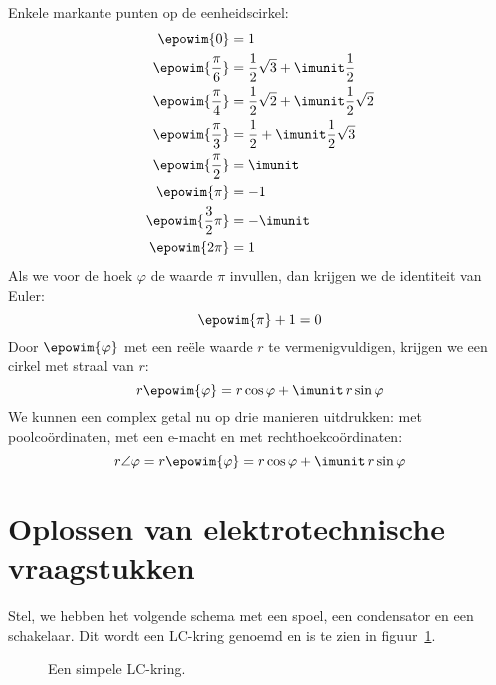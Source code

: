 Enkele markante punten op de eenheidscirkel:
%
\begin{equation}
\begin{split}
\epowim{0} &= 1 \\
\epowim{\frac{\pi}{6}} &= \frac{1}{2}\sqrt{3} + \imunit\frac{1}{2}\\
\epowim{\frac{\pi}{4}} &= \frac{1}{2}\sqrt{2} + \imunit\frac{1}{2}\sqrt{2}\\
\epowim{\frac{\pi}{3}} &= \frac{1}{2} + \imunit\frac{1}{2}\sqrt{3}\\
\epowim{\frac{\pi}{2}} &= \imunit \\
\epowim{\pi} &= -1 \\
\epowim{\frac{3}{2}\pi} &= -\imunit \\
\epowim{2\pi} &= 1 \\
\end{split}
\end{equation}
%
%
Als we voor de hoek $\varphi$ de waarde $\pi$ invullen, dan krijgen we de identiteit van Euler:
%
\begin{equation}
\epowim{\pi} + 1 = 0
\end{equation}Door $\epowim{\varphi}$ met een reële waarde $r$ te vermenigvuldigen, krijgen we een cirkel met straal van $r$:
%
\begin{equation}
r\epowim{\varphi} = r\cos\varphi + \imunit\, r\sin\varphi
\end{equation}
%
We kunnen een complex getal nu op drie manieren uitdrukken: met poolcoördinaten, met een e-macht en met rechthoekcoördinaten:
%
\begin{equation}
r\angle\varphi = r\epowim{\varphi} = r\cos\varphi + \imunit\, r\sin\varphi
\end{equation}

\section{Oplossen van elektrotechnische vraagstukken}
\iftrue
Stel, we hebben het volgende schema met een spoel, een condensator en een schakelaar. Dit wordt een LC-kring genoemd en is te zien in figuur~\ref{fig:comlckring}.

\begin{figure}[!ht]
\centering
{}
\caption{Een simpele LC-kring.}
\label{fig:comlckring}
\end{figure}

